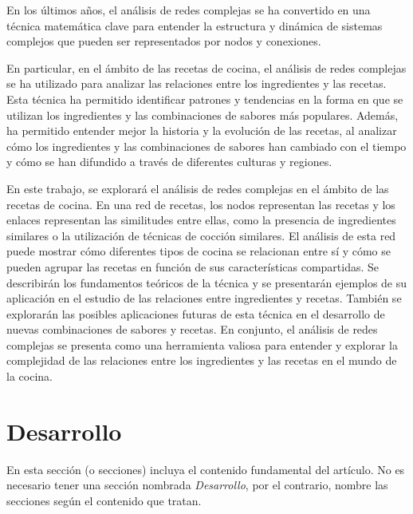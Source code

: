 \documentclass[a4paper]{article}
\begin{document}
En los últimos años, el análisis de redes complejas se ha convertido en una
técnica matemática clave para entender la estructura y dinámica de sistemas
complejos que pueden ser representados por nodos y conexiones.

En particular, en el ámbito de las recetas de cocina, el análisis de redes
complejas se ha utilizado para analizar las relaciones entre los ingredientes y
las recetas. Esta técnica ha permitido identificar patrones y tendencias en la
forma en que se utilizan los ingredientes y las combinaciones de sabores más
populares. Además, ha permitido entender mejor la historia y la evolución de las
recetas, al analizar cómo los ingredientes y las combinaciones de sabores han
cambiado con el tiempo y cómo se han difundido a través de diferentes culturas y
regiones.

En este trabajo, se explorará el análisis de redes complejas en el ámbito de las
recetas de cocina. En una red de recetas, los nodos representan las recetas y
los enlaces representan las similitudes entre ellas, como la presencia de
ingredientes similares o la utilización de técnicas de cocción similares. El
análisis de esta red puede mostrar cómo diferentes tipos de cocina se relacionan
entre sí y cómo se pueden agrupar las recetas en función de sus características
compartidas. Se describirán los fundamentos teóricos de la técnica y se
presentarán ejemplos de su aplicación en el estudio de las relaciones entre
ingredientes y recetas. También se explorarán las posibles aplicaciones futuras
de esta técnica en el desarrollo de nuevas combinaciones de sabores y recetas.
En conjunto, el análisis de redes complejas se presenta como una herramienta
valiosa para entender y explorar la complejidad de las relaciones entre los
ingredientes y las recetas en el mundo de la cocina.




\section{Desarrollo}\label{sec:dev}
  En esta sección (o secciones) incluya el contenido fundamental del artículo.
  No es necesario tener una sección nombrada \emph{Desarrollo}, por el contrario,
  nombre las secciones según el contenido que tratan.
\end{document}
